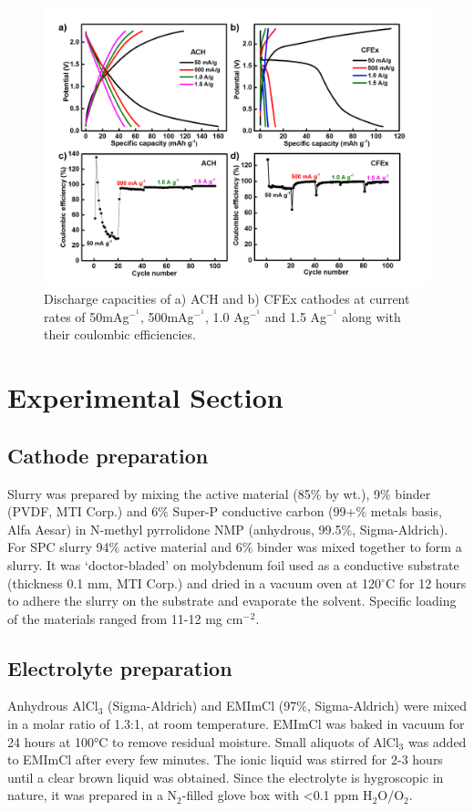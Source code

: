 \documentclass{article}
\begin{document}
\begin{figure}[tbh!]
  \centering
  \includegraphics[width=\textwidth]{figures/CFExACHlong}
    \caption{Discharge capacities of a) ACH and b) CFEx cathodes at current rates of 50mAg$^-^1$, 500mAg$^-^1$, 1.0 Ag$^-^1$ and 1.5 Ag$^-^1$ along with their coulombic efficiencies. }
  \label{figures:CFExACHlong}
\end{figure}
\section{Experimental Section}
\subsection{Cathode preparation}
Slurry was prepared by mixing the active material (85$\%$ by wt.), 9$\%$ binder (PVDF, MTI Corp.) and 6$\%$ Super-P conductive carbon (99+$\%$ metals basis, Alfa Aesar) in N-methyl pyrrolidone NMP (anhydrous, 99.5$\%$, Sigma-Aldrich). For SPC slurry 94$\%$ active material and 6$\%$ binder was mixed together to form a slurry. It was ‘doctor-bladed’ on molybdenum foil used as a conductive substrate (thickness 0.1 mm, MTI Corp.) and dried in a vacuum oven at 120$^{\circ}$C for 12 hours to adhere the slurry on the substrate and evaporate the solvent. Specific loading of the materials ranged from 11-12 mg cm$^-{^2}$. 
\subsection{Electrolyte preparation}
Anhydrous AlCl$_3$ (Sigma-Aldrich) and EMImCl (97$\%$, Sigma-Aldrich) were mixed in a molar ratio of 1.3:1, at room temperature. EMImCl was baked in vacuum for 24 hours at 100°C to remove residual moisture. Small aliquots of AlCl$_3$ was added to EMImCl after every few minutes. The ionic liquid was stirred for 2-3 hours until a clear brown liquid was obtained. Since the electrolyte is hygroscopic in nature, it was prepared in a N$_2$-filled glove box with <0.1 ppm H$_2$O/O$_2$. 
\end{document}
